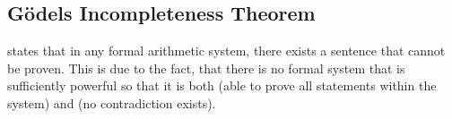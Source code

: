 \documentclass[
../../EiKI_Summary.tex,
]
{subfiles}
\begin{document}
\subsection{Gödels Incompleteness Theorem}
 states that in any formal arithmetic system, there exists a sentence that cannot be proven. This is due to the fact, that there is no formal system that is sufficiently powerful so that it is both  (able to prove all statements within the system) and  (no contradiction exists).
\end{document}

